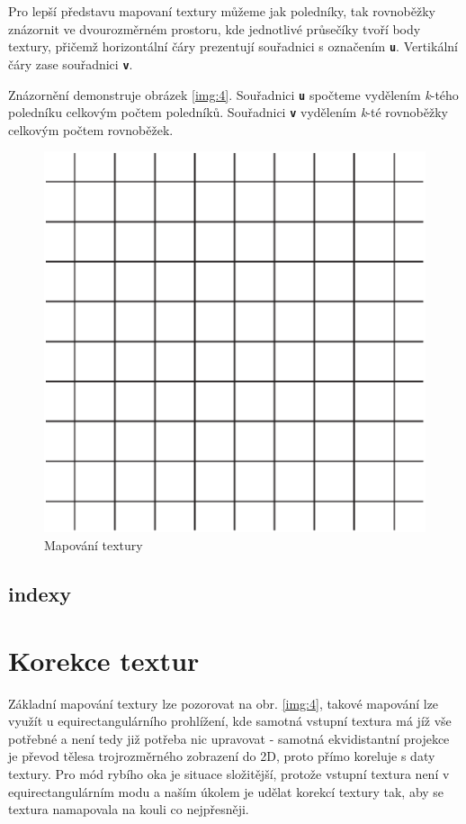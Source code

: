 \newpage

Pro lepší představu mapovaní textury můžeme jak poledníky, tak rovnoběžky znázornit ve dvourozměrném prostoru, kde jednotlivé průsečíky tvoří body textury, přičemž horizontální čáry prezentují souřadnici s označením \texttt{\textbf{u}}. Vertikální čáry zase souřadnici \texttt{\textbf{v}}. 

Znázornění demonstruje obrázek \ref{img:4}. Souřadnici \texttt{\textbf{u}} spočteme vydělením \textit{k}-tého poledníku celkovým počtem poledníků. Souřadnici \texttt{\textbf{v}} vydělením \textit{k}-té rovnoběžky celkovým počtem rovnoběžek.

\begin{figure}[h]
	\label{img:4}
	\centering
	\includegraphics[scale=1.0,angle=0,width=0.4\linewidth]{obrazky-figures/grid}
	\caption{Mapování textury}
	\label{fig:grid}
\end{figure}


\subsection{indexy}

 


\section{Korekce textur}
Základní mapování textury lze pozorovat na obr. \ref{img:4}, takové mapování lze využít u equirectangulárního prohlížení, kde samotná vstupní textura má jíž vše potřebné a není tedy již potřeba nic upravovat - samotná ekvidistantní projekce je převod tělesa trojrozměrného zobrazení do 2D, proto přímo koreluje s daty textury. Pro mód rybího oka je situace složitější, protože vstupní textura není v equirectangulárním modu a naším úkolem je udělat korekcí textury tak, aby se textura namapovala na kouli co nejpřesněji.


\cite{geometrie}
 


